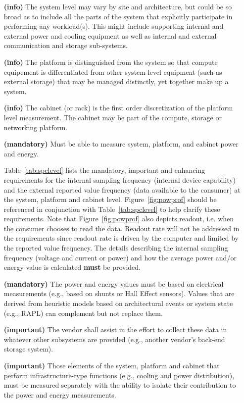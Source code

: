 \begin{itemize}
\item[\textbf{(info)}]
The system level may vary by site and architecture, but could be so broad as to 
include all the parts of the system that explicitly participate in performing 
any workload(s). This might include supporting internal and external power and 
cooling equipment as well as internal and external communication and storage sub-systems. 

\item[\textbf{(info)}]
The platform is distinguished from the system so 
that compute equipement is differentiated from 
other system-level equipment (such as external storage) that may be managed distinctly,
yet together make up a system. 

\item[\textbf{(info)}]
The cabinet (or rack) is the first order discretization of the platform 
level measurement. The cabinet may be part of the compute, storage or networking platform. 

\item[\textbf{(mandatory)}]
Must be able to measure system, platform, and cabinet power and energy.

Table~\ref{tab:spclevel} lists the mandatory, important and enhancing requirements for 
the internal sampling frequency (internal device capability) and the external reported 
value frequency (data available to the consumer) at the system, platform and cabinet level. 
Figure~\ref{fig:powprof} should be referenced in conjunction with Table~\ref{tab:spclevel} to 
help clarify these requirements. Note that Figure~\ref{fig:powprof} also depicts readout, 
i.e. when the consumer chooses to read the data. Readout rate will not be addressed in 
the requirements since readout rate is driven by the computer and limited by the reported 
value frequency. The details describing the internal sampling frequency (voltage and 
current or power) and how the average power and/or energy value is calculated \textbf{must} be provided.

\item[\textbf{(mandatory)}]
The power and energy values must be based on electrical measurements 
(e.g., based on shunts or Hall Effect sensors). Values that are derived from 
heuristic models based on architectural events or system state (e.g., RAPL) can 
complement but not replace them.

\item[\textbf{(important)}]
The vendor shall assist in the effort to collect these data in whatever other 
subsystems are provided (e.g., another vendor’s back-end storage system). 

\item[\textbf{(important)}]
Those elements of the system, platform and cabinet that perform infrastructure-type 
functions (e.g., cooling and power distribution), must be measured separately with the 
ability to isolate their contribution to the power and energy measurements.  

\end{itemize}

